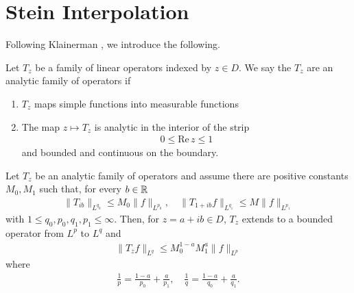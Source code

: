 \section{Stein Interpolation} 
\label{sec:stein-interp}
Following Klainerman \cite{Klainerman:gk}, we introduce the following.  
\begin{definition}
Let $T_{z}$ be a family of linear operators indexed by $z \in D$. We say the
$T_{z}$ are an analytic family of operators if
\begin{enumerate}
\item{$T_{z}$ maps simple functions into measurable functions}
\item{The map $z \mapsto T_{z}$ is analytic in the interior of the strip
%
%
\begin{equation*}
\begin{split}
0 \le \text{Re}\, z \le 1
\end{split}
\end{equation*}
%
%
and bounded and continuous on the boundary.}
\end{enumerate}
\end{definition}
%
%
%
%
%
%
%
%
\begin{lemma}
Let $T_{z}$ be an analytic family of operators and assume there are positive
constants $M_{0}, M_{1}$ such that, for every $b \in \mathbb{R}$
%
%
\begin{equation*}
\begin{split}
\| T_{ib} \|_{L^{q_{0}}} \le M_{0} \| f \|_{L^{p_{0}}}, \quad \|
T_{1 + ib} f \|_{L^{q_{1}}} \le M \| f \|_{L^{p_{1}}}
\end{split}
\end{equation*}
%
%
with $1 \le q_{0}, p_{0}, q_{1}, p_{1} \le \infty$. Then, for $z = a + ib \in
D$, $T_{z}$ extends to a bounded operator from $L^{p}$ to $L^{q}$ and
%
%
\begin{equation*}
\begin{split}
\| T_{z} f \|_{L^{q}} \le M_{0}^{1-a} M_{1}^{a} \| f \|_{L^{p}}
\end{split}
\end{equation*}
%
%
where
%
%
\begin{equation*}
\begin{split}
\frac{1}{p} = \frac{1-a}{p_{0}} + \frac{a}{p_{1}}, \quad \frac{1}{q} =
\frac{1-a}{q_{0}} + \frac{a}{q_{1}}.
\end{split}
\end{equation*}
%
%
\label{lem:stein}
\end{lemma}
